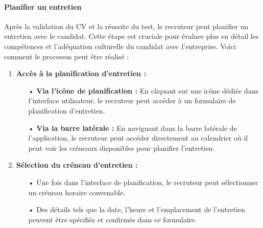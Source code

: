 \paragraph*{Planifier un entretien}

Après la validation du CV et la réussite du test, le recruteur peut 
planifier un entretien avec le candidat. Cette étape est cruciale pour 
évaluer plus en détail les compétences et l'adéquation culturelle du 
candidat avec l'entreprise. Voici comment le processus peut être 
réalisé :

\begin{enumerate}
    \item \textbf{Accès à la planification d'entretien :}
        \begin{itemize}
            \item[•] \textbf{Via l'icône de planification :} En cliquant sur une icône dédiée dans l'interface utilisateur, le recruteur peut accéder à un formulaire de planification d'entretien.
            \item[•] \textbf{Via la barre latérale :} En naviguant dans la barre latérale de l'application, le recruteur peut accéder directement au calendrier où il peut voir les créneaux disponibles pour planifier l'entretien.
        \end{itemize}
    
    \item \textbf{Sélection du créneau d'entretien :}
        \begin{itemize}
            \item[•] Une fois dans l'interface de planification, le recruteur peut sélectionner un créneau horaire convenable.
            \item[•] Des détails tels que la date, l'heure et l'emplacement de l'entretien peuvent être spécifiés et confirmés dans ce formulaire.
        \end{itemize}
    
\end{enumerate}

